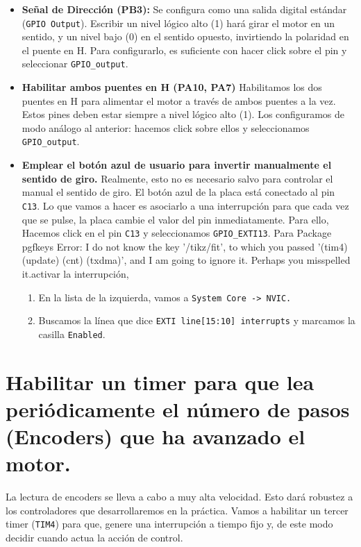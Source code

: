 \begin{itemize}
	\item \textbf{Señal de Dirección (PB3):} Se configura como una salida digital estándar (\texttt{GPIO Output}). Escribir un nivel lógico alto (1) hará girar el motor en un sentido, y un nivel bajo (0) en el sentido opuesto, invirtiendo la polaridad en el puente en H.
	Para configurarlo, es suficiente con hacer click sobre el pin y seleccionar \texttt{GPIO\_output}.
	
	\item \textbf{Habilitar ambos puentes en H (PA10, PA7)} Habilitamos los dos puentes en H para alimentar el motor a través de ambos puentes a la vez. Estos pines deben estar siempre a nivel lógico alto (1). Los configuramos de modo análogo al anterior: hacemos click sobre ellos y seleccionamos \texttt{GPIO\_output}.
	\item \textbf{Emplear el botón azul de usuario para invertir manualmente el sentido de giro.}
Realmente, esto no es necesario salvo para controlar el manual el sentido de giro. El botón azul de la placa está conectado al pin \texttt{C13}. Lo que vamos a hacer es asociarlo a una interrupción para que cada vez que se pulse, la placa cambie el valor del pin inmediatamente. Para ello, Hacemos click en el pin \texttt{C13} y seleccionamos \texttt{GPIO\_EXTI13}. Para Package pgfkeys Error: I do not know the key '/tikz/fit', to which you passed '(tim4) (update) (cnt) (txdma)', and I am going to ignore it. Perhaps you misspelled it.activar la interrupción,
\begin{enumerate}
	\item En la lista de la izquierda, vamos a \texttt{System Core -> NVIC.}
	\item Buscamos la línea que dice \texttt{EXTI line[15:10] interrupts} y marcamos la casilla \texttt{Enabled}.
\end{enumerate}

\end{itemize}

\section{Habilitar un timer para que lea periódicamente el número de pasos (Encoders) que ha avanzado el motor.} 
La lectura de encoders se lleva a cabo a muy alta velocidad. Esto dará robustez a los controladores que desarrollaremos en la práctica. Vamos a habilitar un tercer timer (\texttt{TIM4}) para que, genere una interrupción  a tiempo fijo y, de este modo decidir cuando actua la acción de control. 


